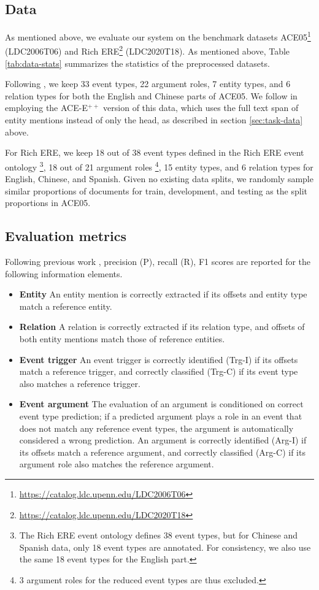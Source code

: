 \documentclass[11pt]{article}
\begin{document}
\subsection{Data}
As mentioned above, we evaluate our system on the benchmark datasets   ACE05\footnote{\url{https://catalog.ldc.upenn.edu/LDC2006T06}} (LDC2006T06) and Rich ERE\footnote{\url{https://catalog.ldc.upenn.edu/LDC2020T18}} (LDC2020T18). As mentioned above, Table \ref{tab:data-stats} summarizes the statistics of the preprocessed datasets.

Following \citet{lin-etal-2020-joint}, we keep 33 event types, 22 argument roles, 7 entity types, and 6 relation types for both the English and Chinese parts of ACE05. We follow \citet{you2022eventgraph} in employing the ACE-E$^{++}$ version of this data, which uses the full text span of entity mentions instead of only the head, as described in section \ref{sec:task-data} above.

For Rich ERE, we keep 18 out of 38 event types defined in the Rich ERE event ontology \footnote{The Rich ERE event ontology defines 38 event types, but for Chinese and Spanish data, only 18 event types are annotated. For consistency, we also use the same 18 event types for the English part.}, 18 out of 21 argument roles \footnote{3 argument roles for the reduced event types are thus excluded.}, 15 entity types, and 6 relation types for English, Chinese, and Spanish. Given no existing data splits, we randomly sample similar proportions of documents for train, development, and testing as the split proportions in ACE05.

\subsection{Evaluation metrics}

Following previous work \citep{lin-etal-2020-joint, nguyen-etal-2021-cross}, precision (P), recall (R), F1 scores are reported for the following information elements.

\begin{itemize}[noitemsep]
    \item \textbf{Entity} An entity mention is correctly extracted if its offsets and entity type match a reference entity.
    \item \textbf{Relation} A relation is correctly extracted if its relation type, and offsets of both entity mentions match those of reference entities.
    \item \textbf{Event trigger} An event trigger is correctly identified (Trg-I) if its offsets match a reference trigger, and correctly classified (Trg-C) if its event type also matches a reference trigger.
    \item \textbf{Event argument} The evaluation of an argument is conditioned on correct event type prediction; if a predicted argument plays a role in an event that does not match any reference event types, the argument is automatically considered a wrong prediction. An argument is correctly identified (Arg-I) if its offsets match a reference argument, and correctly classified (Arg-C) if its argument role also matches the reference argument.
\end{itemize}
\end{document}
